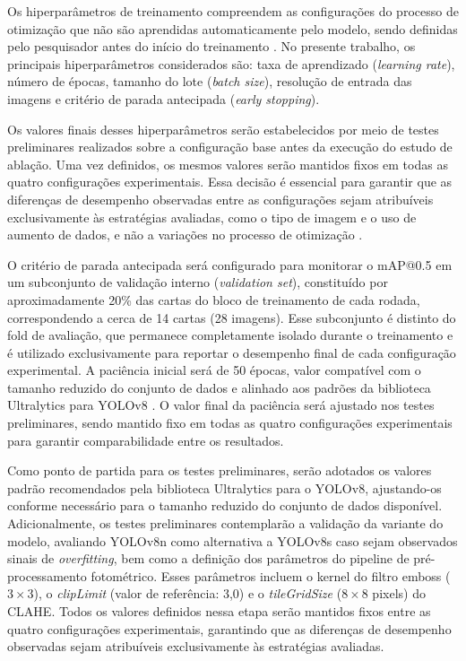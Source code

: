 \documentclass[
    12pt,                %
    openright,           %
    oneside,             %
    a4paper,             %
    english,             %
    brazil               %
]{abntex2}
\begin{document}
Os hiperparâmetros de treinamento compreendem as configurações
do processo de otimização que não são aprendidas automaticamente
pelo modelo, sendo definidas pelo pesquisador antes do início
do treinamento \cite{Dobrzycki2025}. No presente trabalho, os
principais hiperparâmetros considerados são: taxa de aprendizado
(\textit{learning rate}), número de épocas, tamanho do lote
(\textit{batch size}), resolução de entrada das imagens e
critério de parada antecipada (\textit{early stopping}).

Os valores finais desses hiperparâmetros serão estabelecidos 
por meio de testes preliminares realizados sobre a configuração
base antes da execução do estudo de ablação. Uma vez definidos,
os mesmos valores serão mantidos fixos em todas as quatro configurações
experimentais. Essa decisão é essencial para garantir que as diferenças
de desempenho observadas entre as configurações sejam atribuíveis
exclusivamente às estratégias avaliadas, como o tipo de imagem e
o uso de aumento de dados, e não a variações no processo de otimização
\cite{Dobrzycki2025}.

O critério de parada antecipada será configurado para monitorar o 
mAP@0.5 em um subconjunto de validação interno (\textit{validation 
set}), constituído por aproximadamente 20\% das cartas do bloco de 
treinamento de cada rodada, correspondendo a cerca de 14 cartas (28 
imagens). Esse subconjunto é distinto do fold de avaliação, que 
permanece completamente isolado durante o treinamento e é utilizado 
exclusivamente para reportar o desempenho final de cada configuração 
experimental. A paciência inicial será de 50 épocas, valor compatível 
com o tamanho reduzido do conjunto de dados e alinhado aos padrões da 
biblioteca Ultralytics para YOLOv8 \cite{Dobrzycki2025}. O valor final 
da paciência será ajustado nos testes preliminares, sendo mantido fixo 
em todas as quatro configurações experimentais para garantir 
comparabilidade entre os resultados.

Como ponto de partida para os testes preliminares, 
serão adotados os valores padrão recomendados pela
biblioteca Ultralytics para o YOLOv8, ajustando-os
conforme necessário para o tamanho reduzido do 
conjunto de dados disponível. Adicionalmente,
os testes preliminares contemplarão a validação 
da variante do modelo, avaliando YOLOv8n como
alternativa a YOLOv8s caso sejam observados sinais
de \textit{overfitting}, bem como a definição dos
parâmetros do pipeline de pré-processamento fotométrico.
Esses parâmetros incluem o kernel do filtro emboss 
($3{\times}3$), o \textit{clipLimit} (valor de referência: 3,0)
e o \textit{tileGridSize} ($8{\times}8$ pixels) do CLAHE.
Todos os valores definidos nessa etapa serão mantidos fixos 
entre as quatro configurações experimentais, garantindo que
as diferenças de desempenho observadas sejam atribuíveis 
exclusivamente às estratégias avaliadas.
\end{document}
